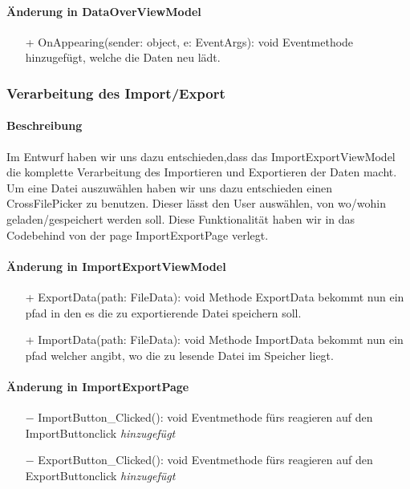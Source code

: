 \documentclass[a4paper,12pt]{article}
\begin{document}
\paragraph{Änderung in DataOverViewModel}
\begin{itemize}
	\item[+] OnAppearing(sender: object, e: EventArgs): void  Eventmethode hinzugefügt, welche die Daten neu lädt.
\end{itemize}


\subsubsection{Verarbeitung des Import/Export}
\paragraph{Beschreibung}
Im Entwurf haben wir uns dazu entschieden,dass das ImportExportViewModel die komplette Verarbeitung des Importieren und Exportieren der Daten macht. Um eine Datei auszuwählen haben wir uns dazu entschieden einen CrossFilePicker zu benutzen. Dieser lässt den User auswählen, von wo/wohin geladen/gespeichert werden soll. Diese Funktionalität haben wir in das Codebehind von der page ImportExportPage verlegt.

\paragraph{Änderung in ImportExportViewModel}
\begin{itemize}
	\item[+] ExportData(path: FileData): void  Methode ExportData bekommt nun ein pfad in den es die zu exportierende Datei speichern soll.
	\item[+] ImportData(path: FileData): void  Methode ImportData bekommt nun ein pfad welcher angibt, wo die zu lesende Datei im Speicher liegt.
\end{itemize}

\paragraph{Änderung in ImportExportPage}
\begin{itemize}
	\item[$-$] ImportButton\_Clicked(): void  Eventmethode fürs reagieren auf den ImportButtonclick \textit{hinzugefügt}
	\item[$-$] ExportButton\_Clicked(): void  Eventmethode fürs reagieren auf den ExportButtonclick \textit{hinzugefügt}
\end{itemize}
\end{document}
